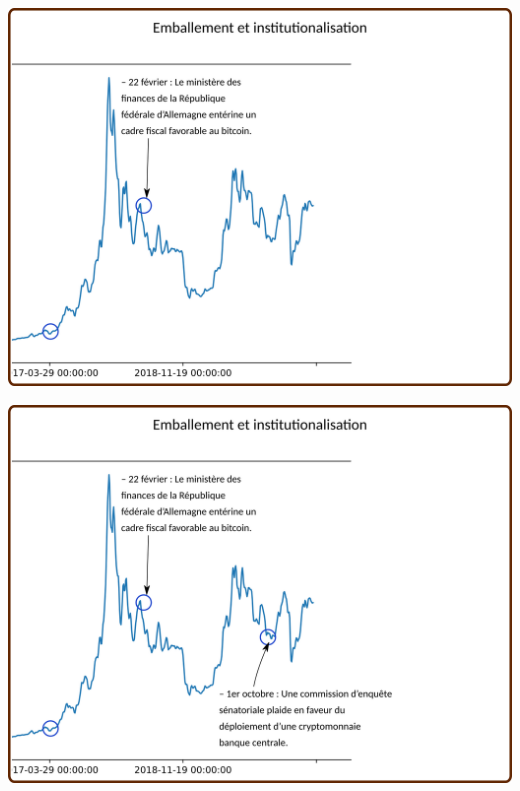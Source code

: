 \documentclass[presentation]{beamer}
\begin{document}
\begin{frame}[label={sec:org4e37dd1}]{}
\begin{center}
\includegraphics[width=.95\textwidth]{./Pictures/Timeline/50emballement_banque.png}
\end{center}
\end{frame}

\begin{frame}[label={sec:orgef2f7c8}]{}
\begin{center}
\includegraphics[width=.95\textwidth]{./Pictures/Timeline/51emballement_senat.png}
\end{center}
\end{frame}
\end{document}
